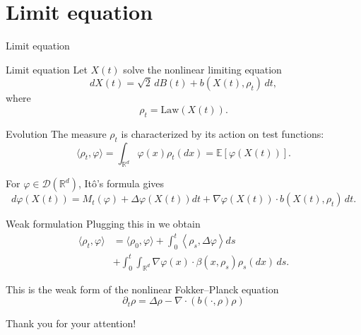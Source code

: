 \documentclass{beamer}
\newcommand{\sectionstart}[1]{
    \section{#1}
    \begin{frame}
        \centering
        \huge{#1}
    \end{frame}
}
\begin{document}
    \sectionstart{Limit equation}

    \begin{frame}{Limit equation}
    Let $X(t)$ solve the nonlinear limiting equation
    \begin{equation*}
        dX(t)
        =
        \sqrt{2}\,dB(t)
        +
        b(X(t),\rho_t)\,dt ,
    \end{equation*}
    where
    \begin{equation*}
        \rho_t = \text{Law}(X(t)).
    \end{equation*}
\end{frame}


\begin{frame}{Evolution}
    The measure $\rho_t$ is characterized by its action on test functions:
    \begin{equation*}
        \langle \rho_t,\varphi\rangle
        =
        \int_{\mathbb{R}^d}\varphi(x)\rho_t(dx)
        =
        \mathbb{E}[\varphi(X(t))].
    \end{equation*}

    \pause
    \medskip
    
    For $\varphi\in \mathcal{D}(\mathbb{R}^d)$, Itô's formula gives
    \begin{equation*}
        d\varphi(X(t))
        =
        M_t(\varphi)+
        \Delta\varphi(X(t))dt
        +
        \nabla\varphi(X(t))
        \cdot
        b(X(t),\rho_t)\,dt .
    \end{equation*}
\end{frame}

\begin{frame}{Weak formulation}
    Plugging this in we obtain
    \begin{align*}
        \langle\rho_t,\varphi\rangle
        &=
        \langle\rho_0,\varphi\rangle
        +
        \int_0^t
        \left\langle
        \rho_s,
        \Delta\varphi
        \right\rangle ds\\
        &+
        \int_0^t
        \int_{\mathbb{R}^d}
        \nabla\varphi(x)
        \cdot
        \beta(x,\rho_s)
        \rho_s(dx)\,ds .
    \end{align*}

    \pause
    This is the weak form of the nonlinear Fokker--Planck equation
    \begin{equation*}
        \partial_t\rho = \Delta \rho - \nabla\cdot(b(\cdot,\rho)\rho)
    \end{equation*}
\end{frame}

\begin{frame}
    \centering\huge{Thank you for your attention!}
\end{frame}
    
\end{document}
